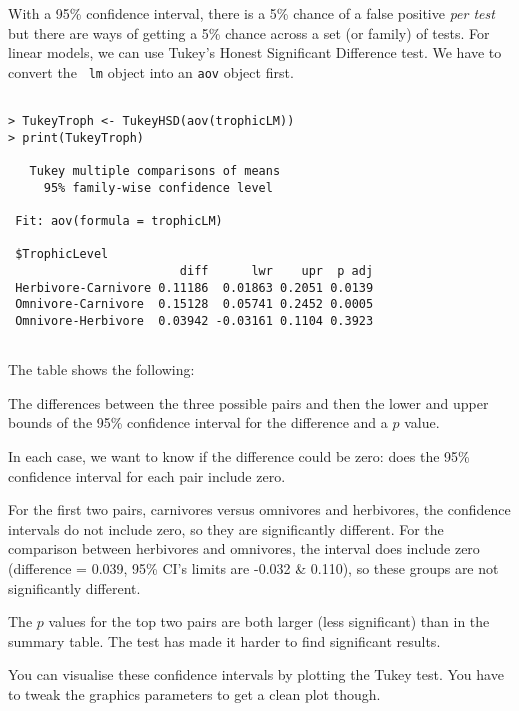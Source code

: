 With a 95\% confidence interval, there is a 5\% chance of a false 
positive {\it per test} but there are ways of getting a 5\% chance 
across a set (or family) of tests. For  linear models, we can use 
Tukey's Honest Significant Difference test. We have to convert the {\tt 
lm} object into an {\tt aov} object first.

\begin{lstlisting}

> TukeyTroph <- TukeyHSD(aov(trophicLM))
> print(TukeyTroph)
	
   Tukey multiple comparisons of means
     95% family-wise confidence level
 
 Fit: aov(formula = trophicLM)
 
 $TrophicLevel
                        diff      lwr    upr  p adj
 Herbivore-Carnivore 0.11186  0.01863 0.2051 0.0139
 Omnivore-Carnivore  0.15128  0.05741 0.2452 0.0005
 Omnivore-Herbivore  0.03942 -0.03161 0.1104 0.3923
 
\end{lstlisting}

The table shows the following:
\begin{compactitem}

	\item The differences between the three possible pairs and then the 
	lower and upper bounds of the 95\% confidence interval for the 
	difference and a $p$ value. 

	\item In each case, we want to know if the difference could be zero: 
	does the 95\% confidence interval for each pair include zero.

	\item For the first two pairs,  carnivores versus omnivores and 
	herbivores, the confidence intervals do not include zero, so they are 
	significantly different. For the comparison between herbivores and 
	omnivores, the interval does include zero (difference = 0.039, 95\% 
	CI's limits are -0.032 \& 0.110), so these groups are not 
	significantly different.

	\item The $p$ values for the top two pairs are both larger (less 
	significant) than in the summary table. The test has made it harder 
	to find significant results.

\end{compactitem}

You can visualise these confidence intervals by plotting the Tukey 
test. You have to tweak the graphics parameters to get a clean plot 
though.

